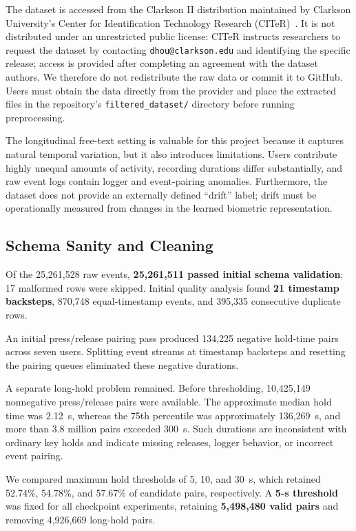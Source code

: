 \documentclass[conference]{IEEEtran}
\begin{document}
The dataset is accessed from the Clarkson II distribution maintained by Clarkson University's Center for Identification Technology Research (CITeR)~\cite{clarkson}. It is not distributed under an unrestricted public license: CITeR instructs researchers to request the dataset by contacting \texttt{dhou@clarkson.edu} and identifying the specific release; access is provided after completing an agreement with the dataset authors. We therefore do not redistribute the raw data or commit it to GitHub. Users must obtain the data directly from the provider and place the extracted files in the repository's \texttt{filtered\_dataset/} directory before running preprocessing.

The longitudinal free-text setting is valuable for this project because it captures natural temporal variation, but it also introduces limitations. Users contribute highly unequal amounts of activity, recording durations differ substantially, and raw event logs contain logger and event-pairing anomalies. Furthermore, the dataset does not provide an externally defined ``drift'' label; drift must be operationally measured from changes in the learned biometric representation.

\subsection{Schema Sanity and Cleaning}

Of the 25,261,528 raw events, \textbf{25,261,511 passed initial schema validation}; 17 malformed rows were skipped. Initial quality analysis found \textbf{21 timestamp backsteps}, 870,748 equal-timestamp events, and 395,335 consecutive duplicate rows.

An initial press/release pairing pass produced 134,225 negative hold-time pairs across seven users. Splitting event streams at timestamp backsteps and resetting the pairing queues eliminated these negative durations.

A separate long-hold problem remained. Before thresholding, 10,425,149 nonnegative press/release pairs were available. The approximate median hold time was 2.12~s, whereas the 75th percentile was approximately 136,269~s, and more than 3.8 million pairs exceeded 300~s. Such durations are inconsistent with ordinary key holds and indicate missing releases, logger behavior, or incorrect event pairing.

We compared maximum hold thresholds of 5, 10, and 30~s, which retained 52.74\%, 54.78\%, and 57.67\% of candidate pairs, respectively. A \textbf{5-s threshold} was fixed for all checkpoint experiments, retaining \textbf{5,498,480 valid pairs} and removing 4,926,669 long-hold pairs.
\end{document}
